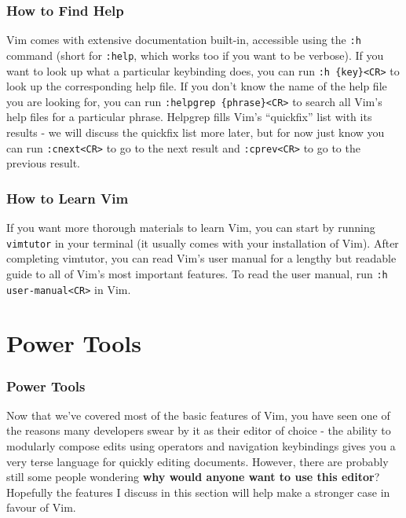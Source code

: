 \documentclass{beamer}
\begin{document}
\begin{frame}[fragile]
    \frametitle{How to Find Help}
    \small
    Vim comes with extensive documentation built-in, accessible using the \verb+:h+ command (short for \verb+:help+, which works too if you want to be verbose). If you want to look up what a particular keybinding does, you can run \verb+:h {key}<CR>+ to look up the corresponding help file. If you don't know the name of the help file you are looking for, you can run \verb+:helpgrep {phrase}<CR>+ to search all Vim's help files for a particular phrase. Helpgrep fills Vim's \enquote{quickfix} list with its results - we will discuss the quickfix list more later, but for now just know you can run \verb+:cnext<CR>+ to go to the next result and \verb+:cprev<CR>+ to go to the previous result.
\end{frame}

\begin{frame}[fragile]
    \frametitle{How to Learn Vim}
    \small
    If you want more thorough materials to learn Vim, you can start by running \verb+vimtutor+ in your terminal (it usually comes with your installation of Vim). After completing vimtutor, you can read Vim's user manual for a lengthy but readable guide to all of Vim's most important features. To read the user manual, run \verb+:h user-manual<CR>+ in Vim.
\end{frame}

\section{Power Tools}

\begin{frame}[fragile]
    \frametitle{Power Tools}
    \tableofcontents[currentsection]
\end{frame}

\begin{frame}[fragile]
    \small
    Now that we've covered most of the basic features of Vim, you have seen one of the reasons many developers swear by it as their editor of choice - the ability to modularly compose edits using operators and navigation keybindings gives you a very terse language for quickly editing documents. However, there are probably still some people wondering \textbf{why would anyone want to use this editor}? Hopefully the features I discuss in this section will help make a stronger case in favour of Vim.
\end{frame}
\end{document}
